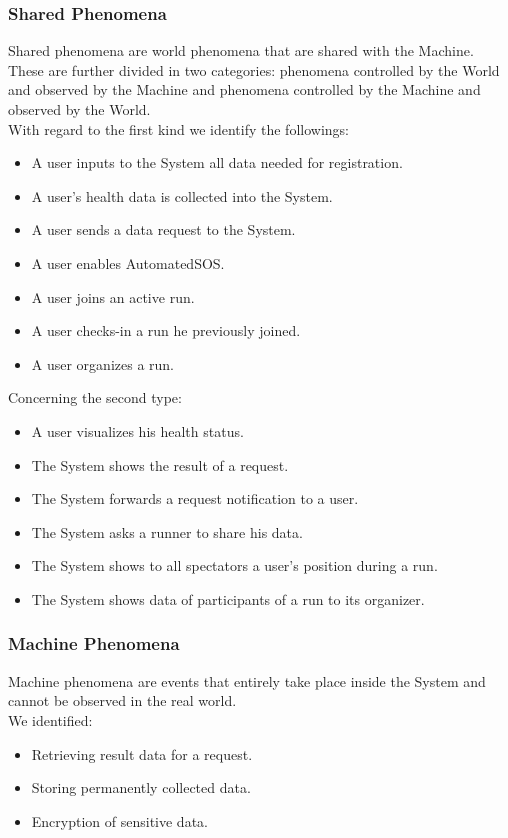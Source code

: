 \documentclass[titlepage]{article}
\begin{document}
		\subsubsection{Shared Phenomena}
		Shared phenomena are world phenomena that are shared with the Machine.\\
These are further divided in two categories: phenomena controlled by the World and observed by the Machine and phenomena controlled by the Machine and observed by the World.\\
With regard to the first kind we identify the followings:
		\begin{itemize}
			\item A user inputs to the System all data needed for registration.
			\item A user’s health data is collected into the System.
			\item A user sends a data request to the System.
			\item A user enables AutomatedSOS.
			\item A user joins an active run.
			\item A user checks-in a run he previously joined.
			\item A user organizes a run.\\
		\end{itemize}
Concerning the second type:	
		\begin{itemize}
			\item A user visualizes his health status.
			\item The System shows the result of a request.
			\item The System forwards a request notification to a user.
			\item The System asks a runner to share his data.
			\item The System shows to all spectators a user’s position during a run.
			\item The System shows data of participants of a run to its organizer.
		\end{itemize}	
		
		\subsubsection{Machine Phenomena}
		Machine phenomena are events that entirely take place inside the System and cannot be observed in the real world.\\
We identified:
		\begin{itemize}
			\item Retrieving result data for a request.
			\item Storing permanently collected data.
			\item Encryption of sensitive data.
		\end{itemize}
\end{document}
